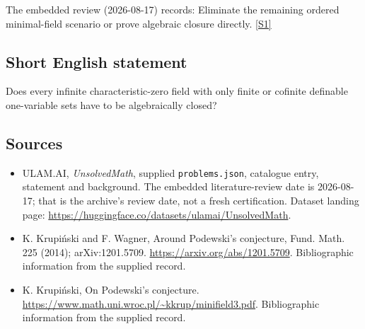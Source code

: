 \documentclass[11pt,a4paper]{article}
\newcommand{\sref}[2]{\hyperlink{source:#1:#2}{[S#2]}}
\begin{document}
The embedded review (2026-08-17) records: Eliminate the remaining ordered minimal-field scenario or prove algebraic closure directly. \sref{statement}{1}

\subsection{Short English statement}

Does every infinite characteristic-zero field with only finite or cofinite definable one-variable sets have to be algebraically closed?

\subsection{Sources}

{\small

\begin{itemize}

\item[\hypertarget{source:statement:1}{S1}] ULAM.AI, \emph{UnsolvedMath}, supplied \texttt{problems.json}, catalogue entry, statement and background. The embedded literature-review date is 2026-08-17; that is the archive’s review date, not a fresh certification. Dataset landing page: \url{https://huggingface.co/datasets/ulamai/UnsolvedMath}.

\item[\hypertarget{source:statement:2}{S2}] K. Krupiński and F. Wagner, Around Podewski's conjecture, Fund. Math. 225 (2014); arXiv:1201.5709. \url{https://arxiv.org/abs/1201.5709}. Bibliographic information from the supplied record.

\item[\hypertarget{source:statement:3}{S3}] K. Krupiński, On Podewski's conjecture. \url{https://www.math.uni.wroc.pl/~kkrup/minifield3.pdf}. Bibliographic information from the supplied record.

\end{itemize}

}

\label{end:statement}
\end{document}
